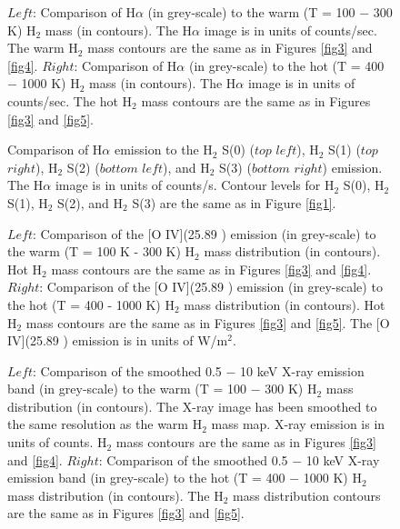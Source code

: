 \documentclass[manuscript]{aastex}
\begin{document}
\clearpage

\begin{figure}
\caption{$Left$: Comparison of  H$\alpha$ (in grey-scale) to the warm (T = 100 $-$ 300 K) 
$\mathrm{H_2}$ mass (in contours).  The H$\alpha$ image is in units of counts/sec. The 
warm $\mathrm{H_2}$ mass contours are the same as in Figures \ref{fig3} and \ref{fig4}.  
$Right$: Comparison of H$\alpha$ (in grey-scale) to the hot (T = 400 $-$ 1000 K) $\mathrm{H_2}$ 
mass (in contours).  The H$\alpha$ image is in units of counts/sec. The hot $\mathrm{H_2}$ 
mass contours are the same as in Figures \ref{fig3} and \ref{fig5}.}
\end{figure}

\clearpage

\begin{figure}
\caption{Comparison of H$\alpha$ emission to the $\mathrm{H_2}$ S(0) ($top$ $left$),  
$\mathrm{H_2}$ S(1) ($top$ $right$),  $\mathrm{H_2}$ S(2) ($bottom$ $left$),  and 
$\mathrm{H_2}$ S(3) ($bottom$ $right$) emission.  The H$\alpha$ image is in units 
of counts/s.  Contour levels for $\mathrm{H_2}$ S(0), $\mathrm{H_2}$ S(1), 
$\mathrm{H_2}$ S(2), and $\mathrm{H_2}$ S(3) are the same as in Figure \ref{fig1}.}
\end{figure}

\clearpage

\begin{figure}
\caption{$Left$:  Comparison of the [O IV](25.89 \micron) emission (in grey-scale) to 
the warm (T = 100 K - 300 K) $\mathrm{H_2}$ mass distribution (in contours).  
Hot $\mathrm{H_2}$ mass contours are the same as in Figures \ref{fig3} and \ref{fig4}.  
$Right$: Comparison of the [O IV](25.89 \micron) emission (in grey-scale) to the hot 
(T = 400 - 1000 K) $\mathrm{H_2}$ mass distribution (in contours).  Hot $\mathrm{H_2}$ 
mass contours are the same as in Figures \ref{fig3} and \ref{fig5}.  The [O IV](25.89 \micron)
 emission is in units of W/$\mathrm{m^2}$.}
\end{figure}

\clearpage

\begin{figure}
\caption{$Left$:  Comparison of the smoothed 0.5 $-$ 10 keV X-ray emission band 
(in grey-scale) to the warm (T = 100 $-$ 300 K) $\mathrm{H_2}$ mass distribution 
(in contours).   The X-ray image has been smoothed to the same resolution as the 
warm $\mathrm{H_2}$ mass map.  X-ray emission is in units of counts.  $\mathrm{H_2}$ 
mass contours are the same as in Figures \ref{fig3} and \ref{fig4}.  $Right$: Comparison 
of the smoothed 0.5 $-$ 10 keV X-ray emission band (in grey-scale) to the hot 
(T = 400 $-$ 1000 K) $\mathrm{H_2}$ mass distribution (in contours).  The 
$\mathrm{H_2}$ mass distribution contours are the same as in Figures \ref{fig3} 
and \ref{fig5}.}
\end{figure}
\end{document}
